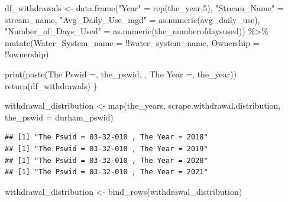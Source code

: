 \documentclass[
  12pt,
]{article}
\newenvironment{Shaded}{\begin{snugshade}}{\end{snugshade}}
\newcommand{\AttributeTok}[1]{\textcolor[rgb]{0.77,0.63,0.00}{#1}}
\newcommand{\DecValTok}[1]{\textcolor[rgb]{0.00,0.00,0.81}{#1}}
\newcommand{\FunctionTok}[1]{\textcolor[rgb]{0.00,0.00,0.00}{#1}}
\newcommand{\NormalTok}[1]{#1}
\newcommand{\OtherTok}[1]{\textcolor[rgb]{0.56,0.35,0.01}{#1}}
\newcommand{\SpecialCharTok}[1]{\textcolor[rgb]{0.00,0.00,0.00}{#1}}
\newcommand{\StringTok}[1]{\textcolor[rgb]{0.31,0.60,0.02}{#1}}
\begin{document}
\begin{Shaded}
\begin{Highlighting}[]
\NormalTok{  df\_withdrawals }\OtherTok{\textless{}{-}} \FunctionTok{data.frame}\NormalTok{(}\StringTok{"Year"} \OtherTok{=} \FunctionTok{rep}\NormalTok{(the\_year,}\DecValTok{5}\NormalTok{),}
                               \StringTok{"Stream\_Name"} \OtherTok{=}\NormalTok{ stream\_name,}
                               \StringTok{"Avg\_Daily\_Use\_mgd"} \OtherTok{=} \FunctionTok{as.numeric}\NormalTok{(avg\_daily\_use),}
                               \StringTok{"Number\_of\_Days\_Used"} \OtherTok{=} \FunctionTok{as.numeric}\NormalTok{(the\_numberofdaysused)) }\SpecialCharTok{\%\textgreater{}\%} 
    \FunctionTok{mutate}\NormalTok{(}\AttributeTok{Water\_System\_name =} \SpecialCharTok{!!}\NormalTok{water\_system\_name,}
         \AttributeTok{Ownership =} \SpecialCharTok{!!}\NormalTok{ownership)}
  
  \FunctionTok{print}\NormalTok{(}\FunctionTok{paste}\NormalTok{(}\StringTok{\textquotesingle{}The Pswid =\textquotesingle{}}\NormalTok{, the\_pswid, }\StringTok{\textquotesingle{}, The Year =\textquotesingle{}}\NormalTok{, the\_year))}
  \FunctionTok{return}\NormalTok{(df\_withdrawals)}
\NormalTok{\}}

\NormalTok{withdrawal\_distribution }\OtherTok{\textless{}{-}} \FunctionTok{map}\NormalTok{(the\_years, scrape.withdrawal.distribution, }\AttributeTok{the\_pswid =}\NormalTok{ durham\_pswid)}
\end{Highlighting}
\end{Shaded}

\begin{verbatim}
## [1] "The Pswid = 03-32-010 , The Year = 2018"
## [1] "The Pswid = 03-32-010 , The Year = 2019"
## [1] "The Pswid = 03-32-010 , The Year = 2020"
## [1] "The Pswid = 03-32-010 , The Year = 2021"
\end{verbatim}

\begin{Shaded}
\begin{Highlighting}[]
\NormalTok{withdrawal\_distribution }\OtherTok{\textless{}{-}} \FunctionTok{bind\_rows}\NormalTok{(withdrawal\_distribution)}
\end{Highlighting}
\end{Shaded}
\end{document}
